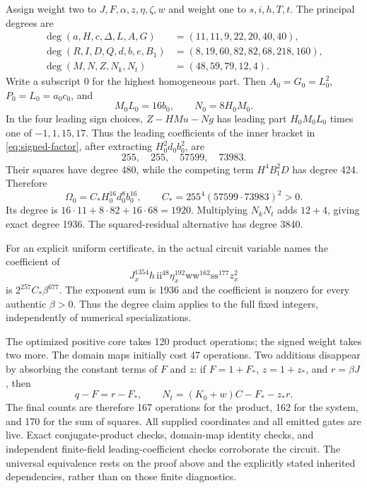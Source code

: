 \documentclass[11pt,letterpaper]{article}
\theoremstyle{remark}
\begin{document}
Assign weight two to $J,F,\alpha,z,\eta,\zeta,w$ and weight one to
$s,i,h,T,t$. The principal degrees are
\begin{align*}
 \deg(a,H,c,\Delta,L,A,G)&=(11,11,9,22,20,40,40),\\
 \deg(R,I,D,Q,d,b,e,B_1)&=(8,19,60,82,82,68,218,160),\\
 \deg(M,N,Z,N_k,N_t)&=(48,59,79,12,4).
\end{align*}
Write a subscript $0$ for the highest homogeneous part. Then
$A_0=G_0=L_0^2$, $P_0=L_0=a_0c_0$, and
\[
 M_0L_0=16b_0,\qquad N_0=8H_0M_0.
\]
In the four leading sign choices, $Z-HMu-Ng$ has leading part
$H_0M_0L_0$ times one of $-1,1,15,17$. Thus the leading coefficients
of the inner bracket in \eqref{eq:signed-factor}, after extracting
$H_0^2d_0b_0^2$, are
\[
 255,\quad255,\quad57599,\quad73983.
\]
Their squares have degree 480, while the competing term $H^4B_1^2D$
has degree 424. Therefore
\begin{equation}\label{eq:integer-top-form}
 \Omega_0=C_*H_0^{16}d_0^8b_0^{16},\qquad
 C_*=255^4(57599\cdot73983)^2>0.
\end{equation}
Its degree is $16\cdot11+8\cdot82+16\cdot68=1920$.
Multiplying $N_kN_t$ adds $12+4$, giving exact degree 1936.
The squared-residual alternative has degree 3840.

For an explicit uniform certificate, in the actual circuit variable
names the coefficient of
\[
 J_x^{1354}h\,\mathrm{ii}^{48}\eta_x^{192}
 \mathrm{ww}^{162}\mathrm{ss}^{177}z_x^2
\]
is $2^{257}C_*\beta^{677}$. The exponent sum is 1936 and the
coefficient is nonzero for every authentic $\beta>0$. Thus the degree
claim applies to the full fixed integers, independently of numerical
specializations.

The optimized positive core takes 120 product operations; the signed
weight takes two more. The domain maps initially cost 47 operations.
Two additions disappear by absorbing the constant terms of $F$ and $z$:
if $F=1+F_*$, $z=1+z_*$, and $r=\beta J$, then
\[
 q-F=r-F_*,\qquad N_t=(K_0+w)C-F_*-z_*r.
\]
The final counts are therefore 167 operations for the product, 162 for
the system, and 170 for the sum of squares. All supplied coordinates and
all emitted gates are live. Exact conjugate-product checks, domain-map
identity checks, and independent finite-field leading-coefficient checks
corroborate the circuit. The universal equivalence rests on the proof
above and the explicitly stated inherited dependencies, rather than on
those finite diagnostics.

\end{document}
